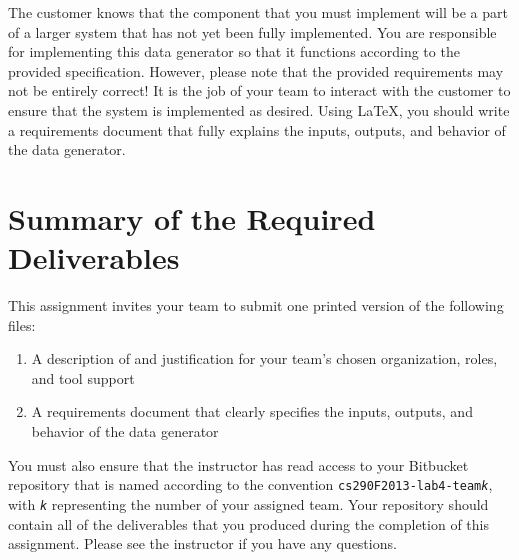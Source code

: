 The customer knows that the component that you must implement will be a part of a larger system that has not yet been
fully implemented.  You are responsible for implementing this data generator so that it functions according to the
provided specification.  However, please note that the provided requirements may not be entirely correct!  It is the job
of your team to interact with the customer to ensure that the system is implemented as desired.  Using \LaTeX, you
should write a requirements document that fully explains the inputs, outputs, and behavior of the data generator.

\section*{Summary of the Required Deliverables}

This assignment invites your team to submit one printed version of the following files:

\begin{enumerate}
	
	\item A description of and justification for your team's chosen organization, roles, and tool support
	\item A requirements document that clearly specifies the inputs, outputs, and behavior of the data generator

\end{enumerate}

You must also ensure that the instructor has read access to your Bitbucket repository that is named according to the
convention {\tt cs290F2013-lab4-team{\em k}}, with {\tt {\em k}} representing the number of your assigned team.  Your
repository should contain all of the deliverables that you produced during the completion of this assignment.  Please
see the instructor if you have any questions.


